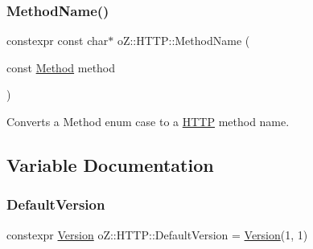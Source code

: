 \subsubsection{\texorpdfstring{MethodName()}{MethodName()}}
{\footnotesize\ttfamily constexpr const char$\ast$ o\+Z\+::\+H\+T\+T\+P\+::\+Method\+Name (\begin{DoxyParamCaption}\item[{const \mbox{\hyperlink{namespaceo_z_1_1_h_t_t_p_a02d8497e4abbb0adf3af0fe9fad1b7a6}{Method}}}]{method }\end{DoxyParamCaption})\hspace{0.3cm}{\ttfamily [noexcept]}}



Converts a Method enum case to a \mbox{\hyperlink{namespaceo_z_1_1_h_t_t_p}{H\+T\+TP}} method name. 



\subsection{Variable Documentation}
\mbox{\label{namespaceo_z_1_1_h_t_t_p_af1d13b042d8595fb3196ce91c5c4955d}} 
\subsubsection{\texorpdfstring{DefaultVersion}{DefaultVersion}}
{\footnotesize\ttfamily constexpr \mbox{\hyperlink{structo_z_1_1_h_t_t_p_1_1_version}{Version}} o\+Z\+::\+H\+T\+T\+P\+::\+Default\+Version = \mbox{\hyperlink{structo_z_1_1_h_t_t_p_1_1_version}{Version}}(1, 1)}

